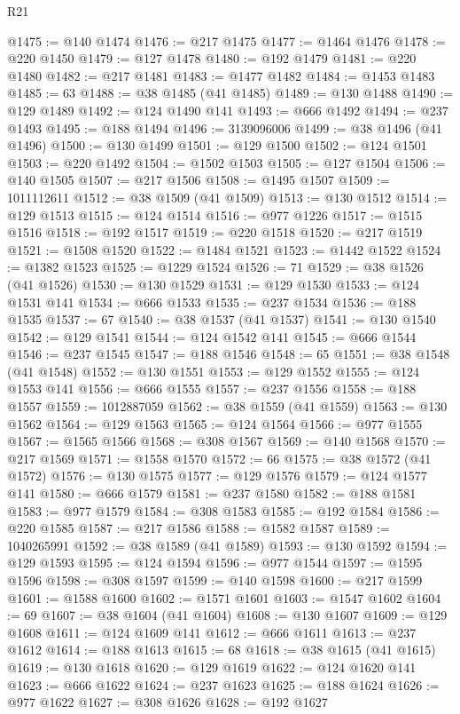 \begin{lexlean}{R21}
\begin{coremodule}
@1475 := @140 @1474
@1476 := @217 @1475
@1477 := @1464 @1476
@1478 := @220 @1450
@1479 := @127 @1478
@1480 := @192 @1479
@1481 := @220 @1480
@1482 := @217 @1481
@1483 := @1477 @1482
@1484 := @1453 @1483
@1485 := 63
@1488 := @38 @1485 (@41 @1485)
@1489 := @130 @1488
@1490 := @129 @1489
@1492 := @124 @1490 @141
@1493 := @666 @1492
@1494 := @237 @1493
@1495 := @188 @1494
@1496 := 3139096006
@1499 := @38 @1496 (@41 @1496)
@1500 := @130 @1499
@1501 := @129 @1500
@1502 := @124 @1501
@1503 := @220 @1492
@1504 := @1502 @1503
@1505 := @127 @1504
@1506 := @140 @1505
@1507 := @217 @1506
@1508 := @1495 @1507
@1509 := 1011112611
@1512 := @38 @1509 (@41 @1509)
@1513 := @130 @1512
@1514 := @129 @1513
@1515 := @124 @1514
@1516 := @977 @1226
@1517 := @1515 @1516
@1518 := @192 @1517
@1519 := @220 @1518
@1520 := @217 @1519
@1521 := @1508 @1520
@1522 := @1484 @1521
@1523 := @1442 @1522
@1524 := @1382 @1523
@1525 := @1229 @1524
@1526 := 71
@1529 := @38 @1526 (@41 @1526)
@1530 := @130 @1529
@1531 := @129 @1530
@1533 := @124 @1531 @141
@1534 := @666 @1533
@1535 := @237 @1534
@1536 := @188 @1535
@1537 := 67
@1540 := @38 @1537 (@41 @1537)
@1541 := @130 @1540
@1542 := @129 @1541
@1544 := @124 @1542 @141
@1545 := @666 @1544
@1546 := @237 @1545
@1547 := @188 @1546
@1548 := 65
@1551 := @38 @1548 (@41 @1548)
@1552 := @130 @1551
@1553 := @129 @1552
@1555 := @124 @1553 @141
@1556 := @666 @1555
@1557 := @237 @1556
@1558 := @188 @1557
@1559 := 1012887059
@1562 := @38 @1559 (@41 @1559)
@1563 := @130 @1562
@1564 := @129 @1563
@1565 := @124 @1564
@1566 := @977 @1555
@1567 := @1565 @1566
@1568 := @308 @1567
@1569 := @140 @1568
@1570 := @217 @1569
@1571 := @1558 @1570
@1572 := 66
@1575 := @38 @1572 (@41 @1572)
@1576 := @130 @1575
@1577 := @129 @1576
@1579 := @124 @1577 @141
@1580 := @666 @1579
@1581 := @237 @1580
@1582 := @188 @1581
@1583 := @977 @1579
@1584 := @308 @1583
@1585 := @192 @1584
@1586 := @220 @1585
@1587 := @217 @1586
@1588 := @1582 @1587
@1589 := 1040265991
@1592 := @38 @1589 (@41 @1589)
@1593 := @130 @1592
@1594 := @129 @1593
@1595 := @124 @1594
@1596 := @977 @1544
@1597 := @1595 @1596
@1598 := @308 @1597
@1599 := @140 @1598
@1600 := @217 @1599
@1601 := @1588 @1600
@1602 := @1571 @1601
@1603 := @1547 @1602
@1604 := 69
@1607 := @38 @1604 (@41 @1604)
@1608 := @130 @1607
@1609 := @129 @1608
@1611 := @124 @1609 @141
@1612 := @666 @1611
@1613 := @237 @1612
@1614 := @188 @1613
@1615 := 68
@1618 := @38 @1615 (@41 @1615)
@1619 := @130 @1618
@1620 := @129 @1619
@1622 := @124 @1620 @141
@1623 := @666 @1622
@1624 := @237 @1623
@1625 := @188 @1624
@1626 := @977 @1622
@1627 := @308 @1626
@1628 := @192 @1627

\end{coremodule}
\end{lexlean}
